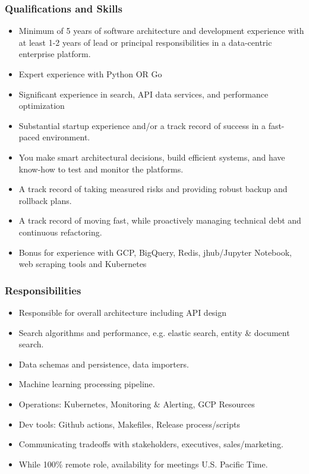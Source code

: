 \subsubsection{Qualifications and Skills}
\begin{itemize}
    \item Minimum of 5 years of software architecture and development experience with at least 1-2 years of lead or principal responsibilities in a data-centric enterprise platform.
    \item Expert experience with Python OR Go
    \item Significant experience in search, API data services, and performance optimization
    \item Substantial startup experience and/or a track record of success in a fast-paced environment.
    \item You make smart architectural decisions, build efficient systems, and have know-how to test and monitor the platforms.
    \item A track record of taking measured risks and providing robust backup and rollback plans.
    \item A track record of moving fast, while proactively managing technical debt and continuous refactoring.
    \item Bonus for experience with GCP, BigQuery, Redis, jhub/Jupyter Notebook, web scraping tools and Kubernetes
\end{itemize}
\subsubsection{Responsibilities}
\begin{itemize}
    \item Responsible for overall architecture including API design
    \item Search algorithms and performance, e.g. elastic search, entity \& document search.
    \item Data schemas and persistence, data importers.
    \item Machine learning processing pipeline.
    \item Operations: Kubernetes, Monitoring \& Alerting, GCP Resources
    \item Dev tools: Github actions, Makefiles, Release process/scripts
    \item Communicating tradeoffs with stakeholders, executives, sales/marketing.
    \item While 100\% remote role, availability for meetings U.S. Pacific Time.
\end{itemize}
